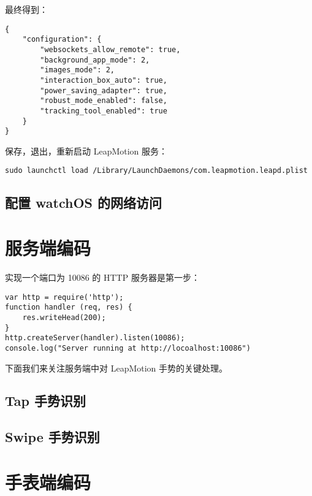 最终得到：

\begin{lstlisting}
{
    "configuration": {
        "websockets_allow_remote": true,
        "background_app_mode": 2,
        "images_mode": 2,
        "interaction_box_auto": true,
        "power_saving_adapter": true,
        "robust_mode_enabled": false,
        "tracking_tool_enabled": true
    }
}
\end{lstlisting}

保存，退出，重新启动 LeapMotion 服务：

\begin{lstlisting}
sudo launchctl load /Library/LaunchDaemons/com.leapmotion.leapd.plist
\end{lstlisting}

\subsection{配置 watchOS 的网络访问}

\section{服务端编码}

实现一个端口为 10086 的 HTTP 服务器是第一步：
\begin{lstlisting}
var http = require('http');
function handler (req, res) {
    res.writeHead(200);
}
http.createServer(handler).listen(10086);
console.log("Server running at http://locoalhost:10086")
\end{lstlisting}

下面我们来关注服务端中对 LeapMotion 手势的关键处理。

\subsection{Tap 手势识别}

\subsection{Swipe 手势识别}

\section{手表端编码}
